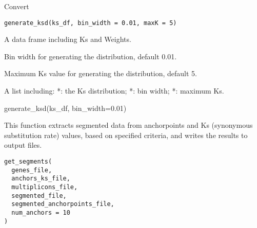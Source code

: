\documentclass[a4paper]{book}
\begin{document}
%
\begin{Description}\relax
Convert
\end{Description}
%
\begin{Usage}
\begin{verbatim}
generate_ksd(ks_df, bin_width = 0.01, maxK = 5)
\end{verbatim}
\end{Usage}
%
\begin{Arguments}
\begin{ldescription}
\item[\code{ks\_df}] A data frame including Ks and Weights.

\item[\code{bin\_width}] Bin width for generating the distribution, default 0.01.

\item[\code{maxK}] Maximum Ks value for generating the distribution, default 5.
\end{ldescription}
\end{Arguments}
%
\begin{Value}
A list including:
*: the Ks distribution;
*: bin width;
*: maximum Ks.
\end{Value}
%
\begin{Examples}
\begin{ExampleCode}
generate_ksd(ks_df, bin_width=0.01)
\end{ExampleCode}
\end{Examples}
%
\begin{Description}\relax
This function extracts segmented data from anchorpoints and Ks (synonymous substitution rate) values,
based on specified criteria, and writes the results to output files.
\end{Description}
%
\begin{Usage}
\begin{verbatim}
get_segments(
  genes_file,
  anchors_ks_file,
  multiplicons_file,
  segmented_file,
  segmented_anchorpoints_file,
  num_anchors = 10
)
\end{verbatim}
\end{Usage}
%
\end{document}
